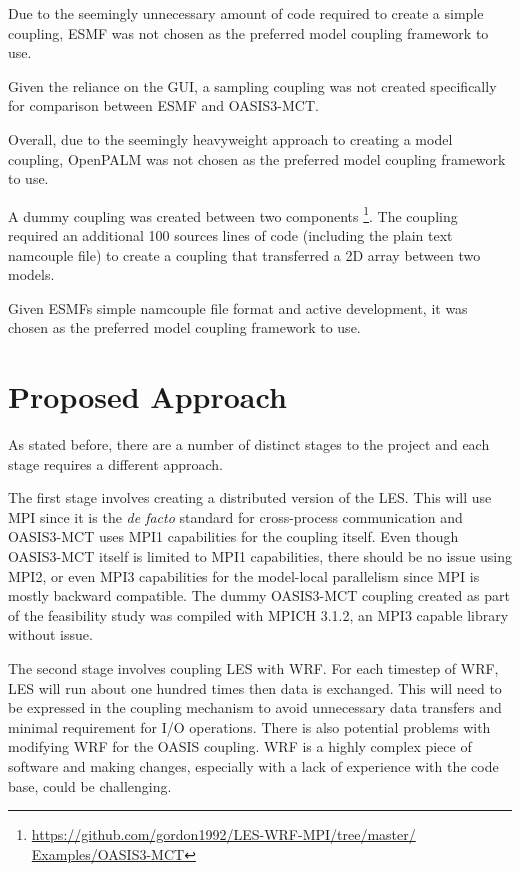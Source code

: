 \documentclass{acm_proc_article-sp}
\renewcommand{\_}{\underscore\hspace{0pt}}
\begin{document}
Due to the seemingly unnecessary amount of code required to create a simple
coupling, ESMF was not chosen as the preferred model coupling framework to use.


Given the reliance on the GUI, a sampling coupling was not created specifically
for comparison between ESMF and OASIS3-MCT.

Overall, due to the seemingly heavyweight approach to creating a model coupling,
OpenPALM was not chosen as the preferred model coupling framework to use.


A dummy coupling was created between two components
\footnote{\url{https://github.com/gordon1992/LES-WRF-MPI/tree/master/
Examples/OASIS3-MCT}}.
The coupling required an additional 100 sources lines of code (including the
plain text namcouple file) to create a coupling that transferred a 2D array
between two models.

Given ESMFs simple namcouple file format and active development, it was chosen
as the preferred model coupling framework to use.

\section*{Proposed Approach}

As stated before, there are a number of distinct stages to the project and each
stage requires a different approach.

The first stage involves creating a distributed version of the LES. This will
use MPI since it is the \textit{de facto} standard for cross-process
communication and OASIS3-MCT uses MPI1 capabilities for the coupling itself.
Even though OASIS3-MCT itself is limited to MPI1 capabilities, there should be
no issue using MPI2, or even MPI3 capabilities for the model-local parallelism
since MPI is mostly backward compatible. The dummy OASIS3-MCT coupling created
as part of the feasibility study was compiled with MPICH 3.1.2, an MPI3 capable
library without issue.

The second stage involves coupling LES with WRF. For each timestep of WRF, LES
will run about one hundred times then data is exchanged. This will need to be
expressed in the coupling mechanism to avoid unnecessary data transfers and
minimal requirement for I/O operations. There is also potential problems with
modifying WRF for the OASIS coupling. WRF is a highly complex piece of software
and making changes, especially with a lack of experience with the code base,
could be challenging.
\end{document}
